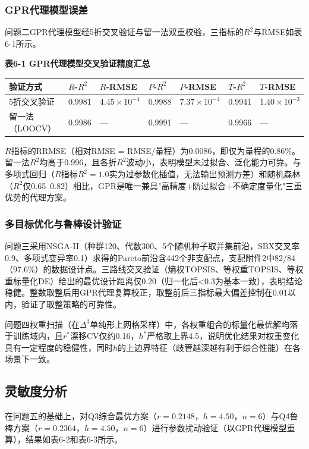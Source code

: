 \documentclass[withoutpreface]{cumcmthesis}
\begin{document}
\subsubsection{GPR代理模型误差}
问题二GPR代理模型经5折交叉验证与留一法双重校验，三指标的$R^2$与RMSE如表6-1所示。

\textbf{表6-1 GPR代理模型交叉验证精度汇总}

\begin{table}[htbp]
\centering
\small
\begin{tabularx}{\textwidth}{XXXXXXX}
\toprule
验证方式 & $R$-$R^2$ & $R$-RMSE & $P$-$R^2$ & $P$-RMSE & $T$-$R^2$ & $T$-RMSE \\
\midrule
5折交叉验证 & 0.9981 & $4.45\times10^{-4}$ & 0.9988 & $7.37\times10^{-4}$ & 0.9941 & $1.40\times10^{-3}$ \\
留一法（LOOCV） & 0.9986 & — & 0.9991 & — & 0.9966 & — \\
\bottomrule
\end{tabularx}
\end{table}
$R$指标的RRMSE（相对RMSE = RMSE/量程）为0.0086，即仅为量程的0.86\%。留一法$R^2$均高于0.996，且各折$R^2$波动小，表明模型未过拟合、泛化能力可靠。与多项式回归（$R$指标$R^2=1.0$实为过参数化插值，无法输出预测方差）和随机森林（$R^2$仅0.65~0.82）相比，GPR是唯一兼具"高精度+防过拟合+不确定度量化"三重优势的代理方案。

\subsubsection{多目标优化与鲁棒设计验证}
问题三采用NSGA-II（种群120、代数300、5个随机种子取并集前沿，SBX交叉率0.9、多项式变异率0.1）求得的Pareto前沿含442个非支配点，支配附件2中82/84（97.6\%）的数据设计点。三路线交叉验证（熵权TOPSIS、等权重TOPSIS、等权重标量化DE）给出的最优设计距离仅0.20（归一化后<0.3为基本一致），表明结论稳健。整数取整后用GPR代理复算校正，取整前后三指标最大偏差控制在0.01以内，验证了取整策略的可靠性。

问题四权重扫描（在$\Delta^3$单纯形上网格采样）中，各权重组合的标量化最优解均落于训练域内，且$r^*$漂移CV仅约0.16，$h^*$严格取上界4.5，说明优化结果对权重变化具有一定程度的稳健性，同时$h$的上边界特征（歧管越深越有利于综合性能）在各场景下一致。

\subsection{灵敏度分析}
在问题五的基础上，对Q3综合最优方案（$r=0.2148$，$h=4.50$，$n=6$）与Q4鲁棒方案（$r=0.2364$，$h=4.50$，$n=6$）进行参数扰动验证（以GPR代理模型重算），结果如表6-2和表6-3所示。
\end{document}
